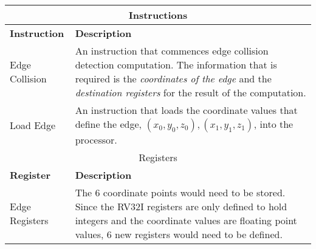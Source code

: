 \begin{table} [H]
\begin{center}
\begin{tabular}{|p{}|p{}|}
\hline
\multicolumn{2}{|c|}{Instructions} \\
\hline
\textbf{Instruction} & \textbf{Description} \\
\hline
Edge Collision  & An instruction that commences edge collision detection computation. The information that is required is the \textit{coordinates of the edge} and the \textit{destination registers} for the result of the computation. \\
\hline
Load Edge & An instruction that loads the coordinate values that define the edge, $(x_0, y_0, z_0), (x_1, y_1, z_1)$, into the processor.\\
\hline
\multicolumn{2}{|c|}{Registers} \\
\hline
\textbf{Register} & \textbf{Description} \\
\hline
Edge Registers & The 6 coordinate points would need to be stored. Since the RV32I registers are only defined to hold integers and the coordinate values are floating point values, 6 new registers would need to be defined.\\
\hline
\end{tabular}
\label{table:xedgcol_specs}
\end{center}
\end{table}
